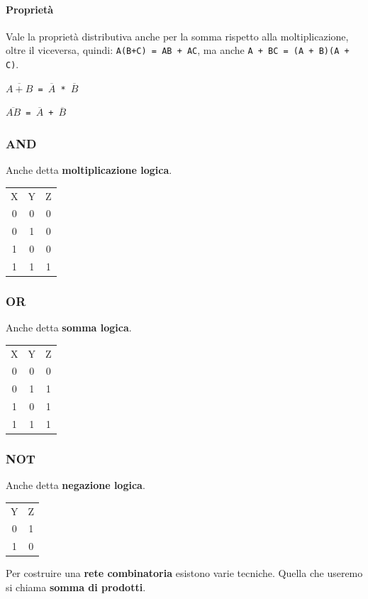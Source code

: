 \documentclass[10pt]{report}
\begin{document}
\paragraph{Proprietà} Vale la proprietà distributiva anche per la somma rispetto alla moltiplicazione, oltre il viceversa, quindi: \texttt{A(B+C) = AB + AC}, ma anche \texttt{A + BC = (A + B)(A + C)}.\\
\begin{list}{-}{Inoltre si hanno le cosiddette \textbf{proprietà di DeMorgan}:}
\item \texttt{$\overline{A + B}$ = $\overline{A}$ * $\overline{B}$}
\item \texttt{$\overline{AB}$ = $\overline{A}$ + $\overline{B}$}
\end{list}
\begin{multicols}{3}
\subsubsection{AND}
Anche detta \textbf{moltiplicazione logica}.\\
\begin{tabular}{cc|c}
X & Y & Z \\
0 & 0 & 0 \\
0 & 1 & 0 \\
1 & 0 & 0 \\
1 & 1 & 1 \\
\end{tabular}
\columnbreak
\subsubsection{OR}
Anche detta \textbf{somma logica}.\\
\begin{tabular}{cc|c}
X & Y & Z \\
0 & 0 & 0 \\
0 & 1 & 1 \\
1 & 0 & 1 \\
1 & 1 & 1 \\
\end{tabular}
\columnbreak
\subsubsection{NOT}
Anche detta \textbf{negazione logica}.\\
\begin{tabular}{c|c}
Y & Z \\
0 & 1 \\
1 & 0 \\
\end{tabular}
\end{multicols}
Per costruire una \textbf{rete combinatoria} esistono varie tecniche. Quella che useremo si chiama \textbf{somma di prodotti}.
\end{document}
